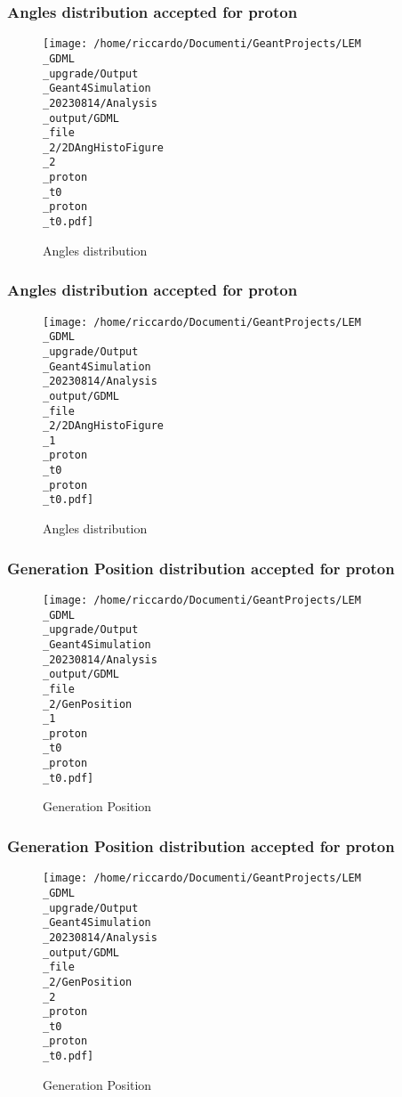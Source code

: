 \documentclass[8pt]{beamer}
\begin{document}
            \begin{frame}
                \frametitle{Angles distribution accepted for proton}
            
        \begin{figure}[h]
            \centering
            \texttt{[image: /home/riccardo/Documenti/GeantProjects/LEM\\\_GDML\\\_upgrade/Output\\\_Geant4Simulation\\\_20230814/Analysis\\\_output/GDML\\\_file\\\_2/2DAngHistoFigure\\\_2\\\_proton\\\_t0\\\_proton\\\_t0.pdf]}
            \caption{Angles distribution}
        \end{figure}
        
            \end{frame}
            
            \begin{frame}
                \frametitle{Angles distribution accepted for proton}
            
        \begin{figure}[h]
            \centering
            \texttt{[image: /home/riccardo/Documenti/GeantProjects/LEM\\\_GDML\\\_upgrade/Output\\\_Geant4Simulation\\\_20230814/Analysis\\\_output/GDML\\\_file\\\_2/2DAngHistoFigure\\\_1\\\_proton\\\_t0\\\_proton\\\_t0.pdf]}
            \caption{Angles distribution}
        \end{figure}
        
            \end{frame}
            
            \begin{frame}
                \frametitle{Generation Position distribution accepted for proton}
            
        \begin{figure}[h]
            \centering
            \texttt{[image: /home/riccardo/Documenti/GeantProjects/LEM\\\_GDML\\\_upgrade/Output\\\_Geant4Simulation\\\_20230814/Analysis\\\_output/GDML\\\_file\\\_2/GenPosition\\\_1\\\_proton\\\_t0\\\_proton\\\_t0.pdf]}
            \caption{Generation Position}
        \end{figure}
        
            \end{frame}
            
            \begin{frame}
                \frametitle{Generation Position distribution accepted for proton}
            
        \begin{figure}[h]
            \centering
            \texttt{[image: /home/riccardo/Documenti/GeantProjects/LEM\\\_GDML\\\_upgrade/Output\\\_Geant4Simulation\\\_20230814/Analysis\\\_output/GDML\\\_file\\\_2/GenPosition\\\_2\\\_proton\\\_t0\\\_proton\\\_t0.pdf]}
            \caption{Generation Position}
        \end{figure}
        
            \end{frame}
            
\end{document}
